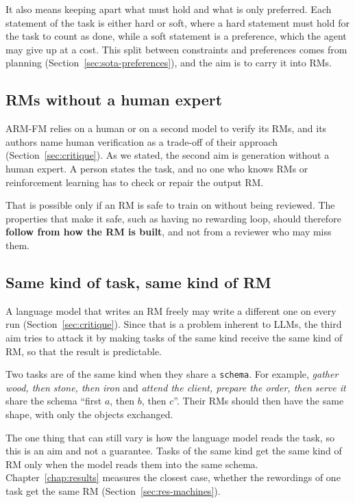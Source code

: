 \documentclass[11pt,english,listoffigures,listoftables]{tfgetsinf}
\begin{document}
It also means keeping apart what must hold and what is only preferred. Each statement of the task is either hard or soft, where a hard statement must hold for the task to count as done, while a soft statement is a preference, which the agent may give up at a cost. This split between constraints and preferences comes from planning (Section~\ref{sec:sota-preferences}), and the aim is to carry it into RMs.

\subsection{RMs without a human expert}
ARM-FM relies on a human or on a second model to verify its RMs, and its authors name human verification as a trade-off of their approach (Section~\ref{sec:critique}). As we stated, the second aim is generation without a human expert. A person states the task, and no one who knows RMs or reinforcement learning has to check or repair the output RM.

That is possible only if an RM is safe to train on without being reviewed. The properties that make it safe, such as having no rewarding loop, should therefore \textbf{follow from how the RM is built}, and not from a reviewer who may miss them.

\subsection{Same kind of task, same kind of RM}
\label{sec:schemas}
A language model that writes an RM freely may write a different one on every run (Section~\ref{sec:critique}). Since that is a problem inherent to LLMs, the third aim tries to attack it by making tasks of the same kind receive the same kind of RM, so that the result is predictable.

Two tasks are of the same kind when they share a \texttt{schema}. For example, \textit{gather wood, then stone, then iron} and \textit{attend the client, prepare the order, then serve it} share the schema ``first $a$, then $b$, then $c$''. Their RMs should then have the same shape, with only the objects exchanged.

The one thing that can still vary is how the language model reads the task, so this is an aim and not a guarantee. Tasks of the same kind get the same kind of RM only when the model reads them into the same schema. Chapter~\ref{chap:results} measures the closest case, whether the rewordings of one task get the same RM (Section~\ref{sec:res-machines}).
\end{document}
